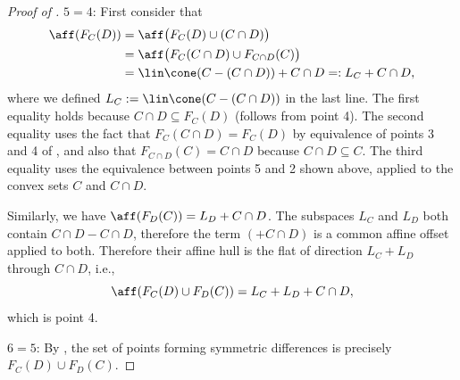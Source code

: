 \documentclass{article}
\theoremstyle{plain}
\theoremstyle{definition}
\theoremstyle{remark}
\begin{document}
\begin{proof}[\hypertarget{loc:affine_cross:lineality.proof}{}Proof of ]
$5 = 4$:
First consider that
\begin{align*}
\aff(F_C(D)) &= \aff\bigl(F_C(D) \cup (C \cap D)\bigr) \\
&= \aff\bigl(F_C(C \cap D) \cup F_{C \cap D}(C)\bigr) \\
&= \lin\cone(C - (C \cap D)) + C \cap D =: L_C + C \cap D,
\end{align*}
where we defined $L_C := \lin \cone(C-(C \cap D))$ in the last line. The first equality holds because $C \cap D \subseteq F_C(D)$ (follows from  point 4). The second equality uses the fact that $F_C(C \cap D) = F_C(D)$ by equivalence of points 3 and 4 of , and also that $F_{C \cap D}(C) = C \cap D$ because $C \cap D \subseteq C$. The third equality uses the equivalence between
points 5 and 2 shown above, applied to the convex sets $C$ and $C \cap D$.

Similarly, we have $\aff(F_D(C)) = L_D + C \cap D$. The subspaces $L_C$ and $L_D$ both contain $C \cap D - C \cap D$, therefore the term $(+ C \cap D)$ is a common affine offset applied to both. Therefore their affine hull is the flat of direction $L_C + L_D$ through $C \cap D$, i.e.,
\begin{equation*}
\aff(F_C(D) \cup F_D(C)) = L_C + L_D + C \cap D,
\end{equation*}
which is point 4.

$6 = 5$:
By ,
the set of points forming symmetric differences is
precisely $F_C(D) \cup F_D(C)$.
\end{proof}
\end{document}
